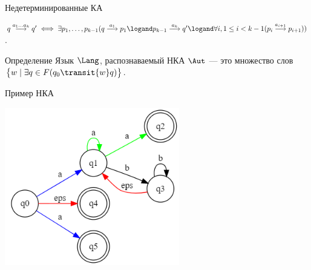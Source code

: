 \begin{frame}{Недетерминированные КА}
{\begin{wideitemize}
            \item $q \overset{a_1\dots a_k}{\longrightarrow} q'\iff \exists p_1,\dots,p_{k-1}(q\overset{a_1}{\longrightarrow}p_1\logand p_{k-1}\overset{a_k}{\longrightarrow}q'\logand \forall i,1\leq i<k-1(p_i\overset{a_{i+1}}{\longrightarrow}p_{i+1}))$.
        \end{wideitemize}

        \vspace{-5pt}
        \begin{block}{Определение}
            Язык $\Lang$, распознаваемый НКА $\Aut$ --- это множество слов $\bigl\lbrace{}w\mid\exists q\in F (q_0\transit{w}q)\bigr\rbrace{}$.
        \end{block}
    }
\end{frame} %

\begin{frame}{Пример НКА}
    \vspace{-5pt}
    \begin{center}
        \includegraphics[width=3in, keepaspectratio]{tompson1.png} %
    \end{center}
\end{frame}%

